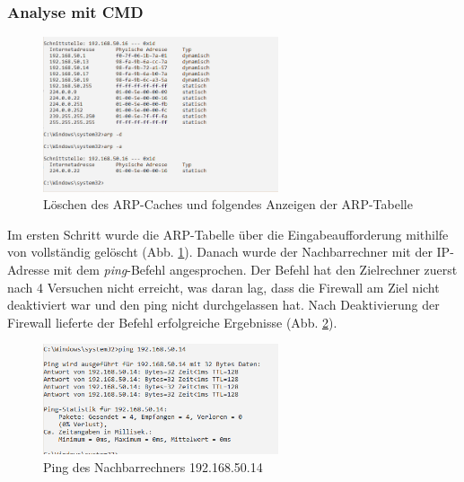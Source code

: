 \subsubsection{Analyse mit CMD}\label{A3.3.1}

\begin{figure}[H]
  \begin{center}
    \includegraphics[width=0.618\textwidth]{graphics/versuch/3_3/arp_d}
    \caption{Löschen des ARP-Caches und folgendes Anzeigen der ARP-Tabelle}\label{abb_arp_d}
  \end{center}
\end{figure}

Im ersten Schritt wurde die ARP-Tabelle über die Eingabeaufforderung mithilfe von  vollständig gelöscht (Abb. \ref{abb_arp_d}). Danach wurde der Nachbarrechner mit der IP-Adresse  mit dem \emph{ping}-Befehl angesprochen. Der Befehl hat den Zielrechner zuerst nach 4 Versuchen nicht erreicht, was daran lag, dass die Firewall am Ziel nicht deaktiviert war und den ping nicht durchgelassen hat. Nach Deaktivierung der Firewall lieferte der Befehl erfolgreiche Ergebnisse (Abb. \ref{abb_ping_1}).


\begin{figure}[H]
  \begin{center}
\includegraphics[width=0.618\textwidth]{graphics/versuch/3_3/ping_nach_abschalten_firewall_auf_zielrechner}
    \caption{Ping des Nachbarrechners 192.168.50.14}\label{abb_ping_1}
  \end{center}
\end{figure}

